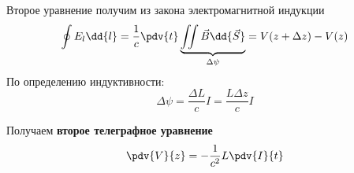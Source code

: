 Второе уравнение получим из закона электромагнитной индукции
\begin{equation}
	\oint E_l \dd{l}= \frac{1}{c} \pdv{t} \underbrace{\iint  \vec B \dd{\vec S}}_{\Delta \psi} = V(z+ \Delta z) - V(z)
\end{equation}
По определению индуктивности:
\begin{equation}
	\Delta \psi = \frac{\Delta L}{c} I = \frac{L \Delta z}{c} I
\end{equation}

Получаем \textbf{второе телеграфное уравнение}
\begin{equation}
	\pdv{V}{z} = - \frac{1}{c^2} L \pdv{I}{t}
\end{equation}


